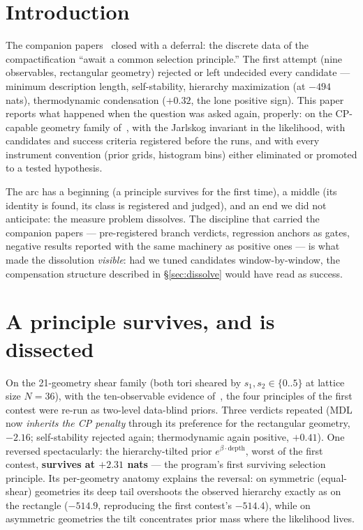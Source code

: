 \documentclass[aps,prd,preprint,nofootinbib]{revtex4-2}
\begin{document}
\maketitle

\section{Introduction}

The companion papers~\cite{Companion,CPpaper} closed with a deferral: the
discrete data of the compactification ``await a common selection principle.''
The first attempt (nine observables, rectangular geometry) rejected or left
undecided every candidate --- minimum description length, self-stability,
hierarchy maximization (at $-494$ nats), thermodynamic condensation ($+0.32$,
the lone positive sign). This paper reports what happened when the question was
asked again, properly: on the CP-capable geometry family of~\cite{CPpaper},
with the Jarlskog invariant in the likelihood, with candidates and success
criteria registered before the runs, and with every instrument convention
(prior grids, histogram bins) either eliminated or promoted to a tested
hypothesis.

The arc has a beginning (a principle survives for the first time), a middle
(its identity is found, its class is registered and judged), and an end we did
not anticipate: the measure problem dissolves. The discipline that carried the
companion papers --- pre-registered branch verdicts, regression anchors as
gates, negative results reported with the same machinery as positive ones ---
is what made the dissolution \emph{visible}: had we tuned candidates
window-by-window, the compensation structure described in \S\ref{sec:dissolve}
would have read as success.

\section{A principle survives, and is dissected}

On the 21-geometry shear family (both tori sheared by $s_1,s_2\in\{0..5\}$ at
lattice size $N=36$), with the ten-observable evidence of~\cite{CPpaper}, the
four principles of the first contest were re-run as two-level data-blind
priors. Three verdicts repeated (MDL now \emph{inherits the CP penalty} through
its preference for the rectangular geometry, $-2.16$; self-stability rejected
again; thermodynamic again positive, $+0.41$). One reversed spectacularly: the
hierarchy-tilted prior $e^{\beta\cdot\mathrm{depth}}$, worst of the first
contest, \textbf{survives at $+2.31$ nats} --- the program's first surviving
selection principle. Its per-geometry anatomy explains the reversal: on
symmetric (equal-shear) geometries its deep tail overshoots the observed
hierarchy exactly as on the rectangle ($-514.9$, reproducing the first
contest's $-514.4$), while on asymmetric geometries the tilt concentrates prior
mass where the likelihood lives.
\end{document}
